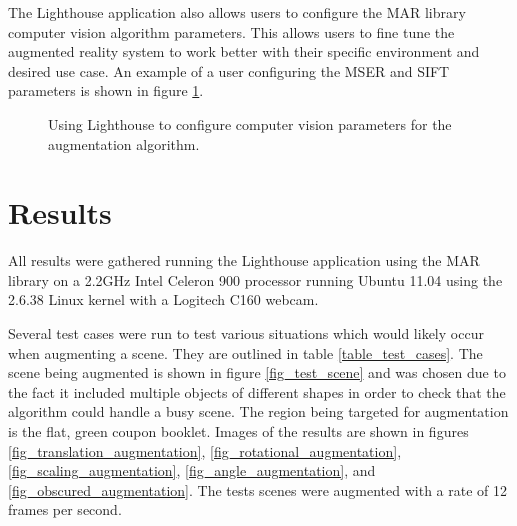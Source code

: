 \documentclass[oneside,11pt]{Latex/Classes/PhDthesisPSnPDF}
\begin{document}
The Lighthouse application also allows users to configure the MAR library computer vision algorithm parameters.  This allows users to fine tune the augmented reality system to work better with their specific environment and desired use case.  An example of a user configuring the MSER and SIFT parameters is shown in figure \ref{fig_lighthouse_configure}.

\begin{figure}[h!]
  \centering
  \quad{}
  \caption{Using Lighthouse to configure computer vision parameters for the augmentation algorithm.}
  \label{fig_lighthouse_configure}
\end{figure}

\chapter{Results}

All results were gathered running the Lighthouse application using the MAR library on a 2.2GHz Intel Celeron 900 processor running Ubuntu 11.04 using the 2.6.38 Linux kernel with a Logitech C160 webcam.

Several test cases were run to test various situations which would likely occur when augmenting a scene.  They are outlined in table \ref{table_test_cases}.  The scene being augmented is shown in figure \ref{fig_test_scene} and was chosen due to the fact it included multiple objects of different shapes in order to check that the algorithm could handle a busy scene.  The region being targeted for augmentation is the flat, green coupon booklet.  Images of the results are shown in figures \ref{fig_translation_augmentation}, \ref{fig_rotational_augmentation}, \ref{fig_scaling_augmentation}, \ref{fig_angle_augmentation}, and \ref{fig_obscured_augmentation}.  The tests scenes were augmented with a rate of 12 frames per second.
\end{document}

